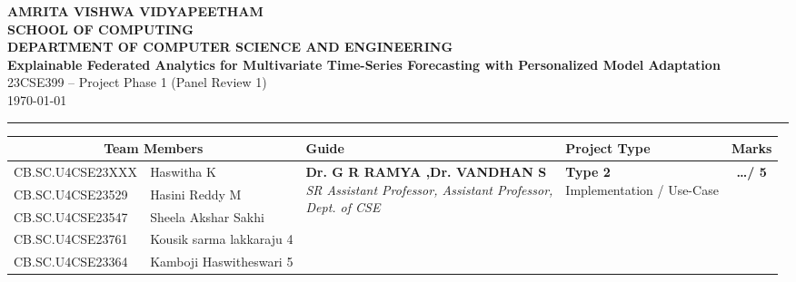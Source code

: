 \documentclass[11pt, a4paper]{article}
\begin{document}
\noindent
\begin{minipage}{\textwidth}
    \centering
    {\Large \textbf{\textcolor{amritaMaroon}{
    AMRITA VISHWA VIDYAPEETHAM \\
    SCHOOL OF COMPUTING \\
    DEPARTMENT OF COMPUTER SCIENCE AND ENGINEERING \\
    }}} 
    \vspace{0.2cm}
    {\large \textbf{Explainable Federated Analytics for Multivariate Time-Series Forecasting with Personalized Model Adaptation}} \\
    \vspace{0.1cm}
    23CSE399 -- Project Phase 1 (Panel Review 1)\\
    \today
\end{minipage}

\vspace{0.3cm}
\hrule
\vspace{0.3cm}

\noindent
\begin{center}
    \renewcommand{\arraystretch}{1.5}
    \setlength{\tabcolsep}{5pt}
    \begin{tabular}{|l|p{4.2cm}|p{4cm}|p{2.5cm}|c|}
        \hline
        \multicolumn{2}{|c|}{\textbf{Team Members}} & \textbf{Guide} & \textbf{Project Type} & \textbf{Marks} \\ 
        \hline
        
        \small CB.SC.U4CSE23XXX & \small \raggedright Haswitha K & 
        \multirow{5}{=}{\raggedright \small \textbf{Dr. G R RAMYA ,Dr. VANDHAN S} \newline \textit{SR Assistant Professor, Assistant Professor, \newline Dept. of CSE}} & 
        \multirow{5}{=}{\raggedright \small \textbf{Type 2} \newline Implementation / Use-Case} & 
        \multirow{5}{*}{\textbf{\huge \dots / 5}} \\ \cline{1-2}
        
        \small CB.SC.U4CSE23529 & \small Hasini Reddy M & & & \\ \cline{1-2}
        
        \small CB.SC.U4CSE23547 & \small Sheela Akshar Sakhi & & & \\ \cline{1-2}
        
        \small CB.SC.U4CSE23761 & \small Kousik sarma lakkaraju 4 & & & \\ 
        \cline{1-2}
        
        \small CB.SC.U4CSE23364 & \small Kamboji Haswitheswari 5 & & & \\ 
        \hline
    \end{tabular}
\end{center}
\vspace{0.2cm}
\end{document}
